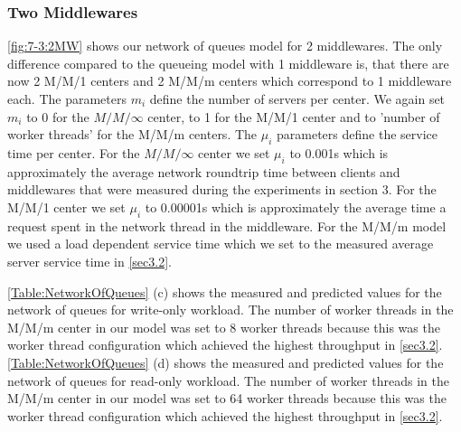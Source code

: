 \documentclass[11pt,a4paper]{article}
\begin{document}
\subsubsection{Two Middlewares}
\autoref{fig:7-3:2MW} shows our network of queues model for 2 middlewares. The only difference compared to the queueing model with 1 middleware is, that there are now 2 M/M/1 centers and 2 M/M/m centers which correspond to 1 middleware each. The parameters $m_i$ define the number of servers per center. We again set $m_i$ to 0 for the $M/M/\infty$ center, to 1 for the M/M/1 center and to 'number of worker threads' for the M/M/m centers.
The $\mu_i$ parameters define the service time per center. For the $M/M/\infty$ center we set $\mu_i$ to 0.001s which is approximately the average network roundtrip time between clients and middlewares that were measured during the experiments in section 3. For the M/M/1 center we set $\mu_i$ to 0.00001s which is approximately the average time a request spent in the network thread in the middleware.
For the M/M/m model we used a load dependent service time which we set to the measured average server service time in \autoref{sec3.2}.

\autoref{Table:NetworkOfQueues} (c) shows the measured and predicted values for the network of queues for write-only workload. The number of worker threads in the M/M/m center in our model was set to 8 worker threads because this was the worker thread configuration which achieved the highest throughput in \autoref{sec3.2}. 
\autoref{Table:NetworkOfQueues} (d) shows the measured and predicted values for the network of queues for read-only workload. The number of worker threads in the M/M/m center in our model was set to 64 worker threads because this was the worker thread configuration which achieved the highest throughput in \autoref{sec3.2}. 
\end{document}
